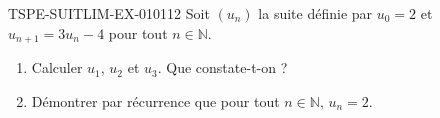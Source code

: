 \begin{exercice}{TSPE-SUITLIM-EX-010}{1}{12}
Soit $(u_n)$ la suite définie par $u_0 = 2$ et $u_{n+1} = 3u_n - 4$ pour tout $n \in \mathbb{N}$.
\begin{enumerate}
  \item Calculer $u_1$, $u_2$ et $u_3$. Que constate-t-on ?
  \item Démontrer par récurrence que pour tout $n \in \mathbb{N}$, $u_n = 2$.
\end{enumerate}
\end{exercice}
